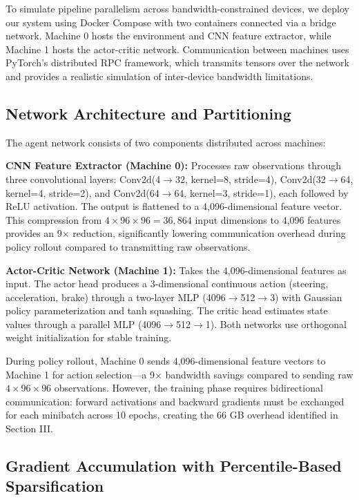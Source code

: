 \documentclass[conference]{IEEEtran}
\begin{document}
To simulate pipeline parallelism across bandwidth-constrained devices, we deploy our system using Docker Compose with two containers connected via a bridge network. Machine 0 hosts the environment and CNN feature extractor, while Machine 1 hosts the actor-critic network. Communication between machines uses PyTorch's distributed RPC framework, which transmits tensors over the network and provides a realistic simulation of inter-device bandwidth limitations.

\subsection{Network Architecture and Partitioning}

The agent network consists of two components distributed across machines:

\textbf{CNN Feature Extractor (Machine 0):} Processes raw observations through three convolutional layers: Conv2d(4$\rightarrow$32, kernel=8, stride=4), Conv2d(32$\rightarrow$64, kernel=4, stride=2), and Conv2d(64$\rightarrow$64, kernel=3, stride=1), each followed by ReLU activation. The output is flattened to a 4,096-dimensional feature vector. This compression from $4 \times 96 \times 96 = 36,864$ input dimensions to 4,096 features provides an 9$\times$ reduction, significantly lowering communication overhead during policy rollout compared to transmitting raw observations.

\textbf{Actor-Critic Network (Machine 1):} Takes the 4,096-dimensional features as input. The actor head produces a 3-dimensional continuous action (steering, acceleration, brake) through a two-layer MLP (4096$\rightarrow$512$\rightarrow$3) with Gaussian policy parameterization and tanh squashing. The critic head estimates state values through a parallel MLP (4096$\rightarrow$512$\rightarrow$1). Both networks use orthogonal weight initialization for stable training.

During policy rollout, Machine 0 sends 4,096-dimensional feature vectors to Machine 1 for action selection—a 9$\times$ bandwidth savings compared to sending raw $4 \times 96 \times 96$ observations. However, the training phase requires bidirectional communication: forward activations and backward gradients must be exchanged for each minibatch across 10 epochs, creating the 66 GB overhead identified in Section III.

\subsection{Gradient Accumulation with Percentile-Based Sparsification}
\end{document}
